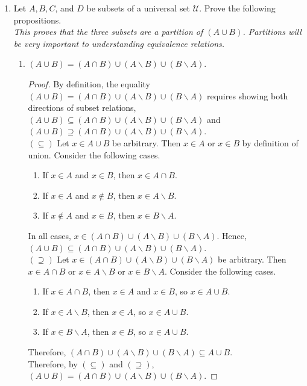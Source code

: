 \documentclass{article}
\theoremstyle{definition}
\begin{document}
\begin{enumerate}
  \item Let $A, B, C$, and $D$ be subsets of a universal set $\mathcal{U}$. 
  Prove the following propositions.\\
  \textit{This proves that the three subsets are a partition of $(A \cup B)$. Partitions will be very important to understanding equivalence relations.}
  \begin{enumerate}
  \item $(A \cup B)=(A \cap B) \cup(A \backslash B) \cup(B \backslash A)$.
  \begin{proof}
    By definition, the equality $(A \cup B)=(A \cap B) \cup(A \backslash B) \cup(B \backslash A)$ 
    requires showing both directions of subset relations, 
    $(A \cup B) \subseteq (A \cap B) \cup(A \backslash B) \cup(B \backslash A)$ and 
    $(A \cup B) \supseteq (A \cap B) \cup(A \backslash B) \cup(B \backslash A)$.\vspace*{10px}\\
    $(\subseteq)$ Let $x \in A \cup B$ be arbitrary. Then $x \in A$ or $x \in B$ 
    by definition of union. Consider the following cases.
    \begin{enumerate}
    \item If $x \in A$ and $x \in B$, then $x \in A \cap B$.
    \item If $x \in A$ and $x \notin B$, then $x \in A \backslash B$.
    \item If $x \notin A$ and $x \in B$, then $x \in B \backslash A$.
    \end{enumerate}
    In all cases, $x \in (A \cap B) \cup(A \backslash B) \cup(B \backslash A)$. 
    Hence, $(A \cup B) \subseteq (A \cap B) \cup(A \backslash B) \cup(B \backslash A)$.\vspace*{10px}\\
    $(\supseteq)$ Let $x \in (A \cap B) \cup(A \backslash B) \cup(B \backslash A)$ be arbitrary. 
    Then $x \in A \cap B$ or $x \in A \backslash B$ or $x \in B \backslash A$. Consider the following cases.
    \begin{enumerate}
    \item If $x \in A \cap B$, then $x \in A$ and $x \in B$, so $x \in A \cup B$.
    \item If $x \in A \backslash B$, then $x \in A$, so $x \in A \cup B$.
    \item If $x \in B \backslash A$, then $x \in B$, so $x \in A \cup B$.
    \end{enumerate}
    Therefore, $(A \cap B) \cup(A \backslash B) \cup(B \backslash A) \subseteq A \cup B$.\vspace*{10px}\\
    Therefore, by $(\subseteq)$ and $(\supseteq)$, 
    $(A \cup B)=(A \cap B) \cup(A \backslash B) \cup(B \backslash A)$.
  \end{proof}


\end{enumerate}
\end{enumerate}
\end{document}
